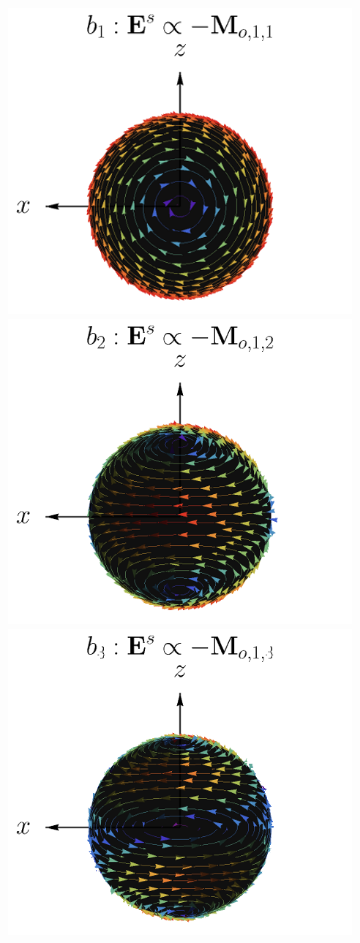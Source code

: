 \documentclass[letterpaper,11pt] {article}
\begin{document}
\begin{figure}[h]
		\begin{subfigure}{.9\linewidth}			
		\includegraphics[scale=.25]{1-Teoria/figs/Mo11_static_crop.png}%
		\includegraphics[scale=.25]{1-Teoria/figs/Mo12_static_crop.png}%
		\includegraphics[scale=.25]{1-Teoria/figs/Mo13_static_crop.png}%

\end{subfigure}
\end{figure}
\end{document}
